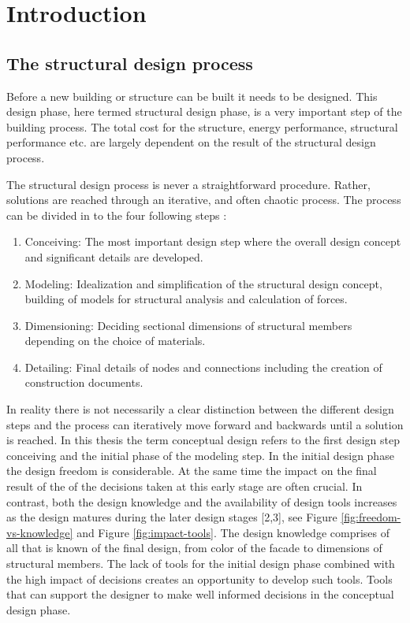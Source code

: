 \chapter{Introduction}
\label{ch:Introduction}
\section{The structural design process}
Before a new building or structure can be built it needs to be designed. This design phase, here termed structural design phase, is a very important step of the building process. The total cost for the structure, energy performance, structural performance etc. are largely dependent on the result of the structural design process. 

The structural design process is never a straightforward procedure. Rather, solutions are reached through an iterative, and often chaotic process. The process can be divided in to the four following steps \cite{schlaich2006challenges}:

\begin{enumerate}  
\item Conceiving: The most important design step where the overall design concept and significant details are developed.
\item Modeling: Idealization and simplification of the structural design concept, building of models for structural analysis and calculation of forces.
\item Dimensioning: Deciding sectional dimensions of structural members depending on the choice of materials.
\item Detailing: Final details of nodes and connections including the creation of construction documents.
\end{enumerate}

In reality there is not necessarily a clear distinction between the different design steps and the process can iteratively move forward and backwards until a solution is reached. In this thesis the term conceptual design refers to the first design step conceiving and the initial phase of the modeling step. In the initial design phase the design freedom is considerable. At the same time the impact on the final result of the of the decisions taken at this early stage are often crucial. In contrast, both the design knowledge and the availability of design tools increases as the design matures during the later design stages [2,3], see Figure \ref{fig:freedom-vs-knowledge} and Figure \ref{fig:impact-tools}. The design knowledge comprises of all that is known of the final design, from color of the facade to dimensions of structural members. The lack of tools for the initial design phase combined with the high impact of decisions creates an opportunity to develop such tools. Tools that can support the designer to make well informed decisions in the conceptual design phase.

